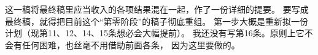 这一稿将最终稿里应当收入的各项结果混在一起，作了一份详细的提要。
要写成最终稿，就得把目前这个“第零阶段”的稿子彻底重组。
第一步大概是重新拟一份计划（现第11、12、14、15条想必会大幅提前）。
我还没有写第16条。原则上它不会有任何困难，也丝毫不用借助前面各条，
因为这里要做的\gap。
\par\endgroup

